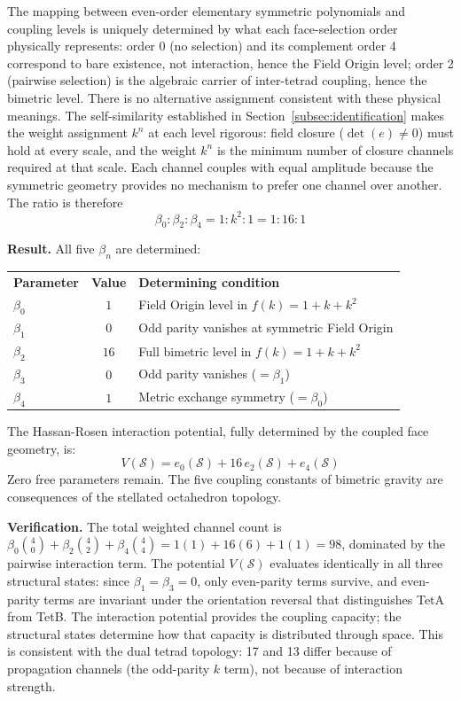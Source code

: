 \documentclass[aps,prd,preprint,superscriptaddress,showpacs,preprintnumbers,amsmath,amssymb,nofootinbib]{revtex4-2}
\begin{document}
The mapping between even-order elementary symmetric polynomials and coupling levels is uniquely determined by what each face-selection order physically represents: order 0 (no selection) and its complement order 4 correspond to bare existence, not interaction, hence the Field Origin level; order 2 (pairwise selection) is the algebraic carrier of inter-tetrad coupling, hence the bimetric level. There is no alternative assignment consistent with these physical meanings. The self-similarity established in Section~\ref{subsec:identification} makes the weight assignment $k^n$ at each level rigorous: field closure ($\det(e) \neq 0$) must hold at every scale, and the weight $k^n$ is the minimum number of closure channels required at that scale. Each channel couples with equal amplitude because the symmetric geometry provides no mechanism to prefer one channel over another. The ratio is therefore
\begin{equation}
\beta_0 : \beta_2 : \beta_4 = 1 : k^2 : 1 = 1 : 16 : 1
\label{eq:beta-ratio}
\end{equation}

\textbf{Result.} All five $\beta_n$ are determined:
\begin{center}
\renewcommand{\arraystretch}{1.3}
\begin{tabular}{@{}lcl@{}}
\textbf{Parameter} & \textbf{Value} & \textbf{Determining condition} \\[2pt]
$\beta_0$ & $1$ & Field Origin level in $f(k) = 1 + k + k^2$ \\
$\beta_1$ & $0$ & Odd parity vanishes at symmetric Field Origin \\
$\beta_2$ & $16$ & Full bimetric level in $f(k) = 1 + k + k^2$ \\
$\beta_3$ & $0$ & Odd parity vanishes ($= \beta_1$) \\
$\beta_4$ & $1$ & Metric exchange symmetry ($= \beta_0$) \\
\end{tabular}
\end{center}

The Hassan-Rosen interaction potential, fully determined by the coupled face geometry, is:
\begin{equation}
V(\mathcal{S}) = e_0(\mathcal{S}) + 16\,e_2(\mathcal{S}) + e_4(\mathcal{S})
\label{eq:V-determined}
\end{equation}
Zero free parameters remain. The five coupling constants of bimetric gravity are consequences of the stellated octahedron topology.

\textbf{Verification.} The total weighted channel count is $\beta_0\binom{4}{0} + \beta_2\binom{4}{2} + \beta_4\binom{4}{4} = 1(1) + 16(6) + 1(1) = 98$, dominated by the pairwise interaction term. The potential $V(\mathcal{S})$ evaluates identically in all three structural states: since $\beta_1 = \beta_3 = 0$, only even-parity terms survive, and even-parity terms are invariant under the orientation reversal that distinguishes TetA from TetB. The interaction potential provides the coupling capacity; the structural states determine how that capacity is distributed through space. This is consistent with the dual tetrad topology: 17 and 13 differ because of propagation channels (the odd-parity $k$ term), not because of interaction strength.
\end{document}
